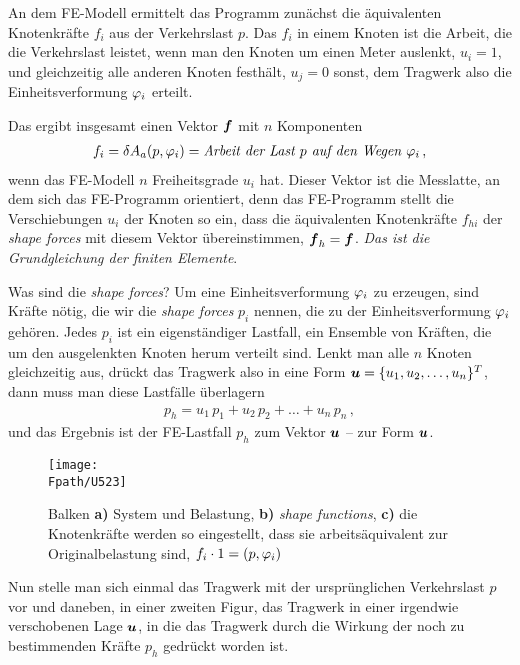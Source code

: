 An dem FE-Modell ermittelt das Programm zun\"{a}chst die \"{a}quivalenten Knotenkr\"{a}fte $f_i$ aus der Verkehrslast $p$. Das $f_i$ in einem Knoten ist die Arbeit, die die Verkehrslast leistet, wenn man den Knoten um einen Meter auslenkt, $u_i = 1$, und gleichzeitig alle anderen Knoten festh\"{a}lt, $u_j = 0$ sonst, dem Tragwerk also die Einheitsverformung $\varphi_i$ erteilt.

Das ergibt insgesamt einen Vektor $\mbox{\boldmath $f$} $ mit $n$ Komponenten
\begin{align}
f_i = \delta A_a(p,\varphi_i) = \text{{\em Arbeit der Last $p$ auf den Wegen $\varphi_i$\/}}\,,
\end{align}
wenn das FE-Modell $n$ Freiheitsgrade $u_i$ hat. Dieser Vektor ist die Messlatte, an dem sich das FE-Programm orientiert, denn das FE-Programm stellt die Verschiebungen $u_i$ der Knoten so ein, dass die \"{a}quivalenten Knotenkr\"{a}fte $f_{hi}$ der {\em shape forces\/} mit diesem Vektor \"{u}bereinstimmen, $\mbox{\boldmath $f$}_h = \mbox{\boldmath $f$}$. {\em Das ist die Grundgleichung der finiten Elemente\/}.

Was sind die {\em shape forces\/}? Um eine Einheitsverformung $\varphi_i$ zu erzeugen, sind Kr\"{a}fte n\"{o}tig, die wir die {\em shape forces\/} $p_i$ nennen, die zu der Einheitsverformung $\varphi_i$ geh\"{o}ren. Jedes $p_i$ ist ein eigenst\"{a}ndiger Lastfall, ein Ensemble von Kr\"{a}ften, die um den ausgelenkten Knoten herum verteilt sind. Lenkt man alle $n$ Knoten gleichzeitig aus, dr\"{u}ckt das Tragwerk also in eine Form $\mbox{\boldmath $u$} = \{u_1, u_2, \ldots, u_n\}^T$, dann muss man diese Lastf\"{a}lle \"{u}berlagern
\begin{align}
p_h = u_1\,p_1 + u_2\,p_2 + \ldots + u_n\,p_n\,,
\end{align}
und das Ergebnis ist der FE-Lastfall $p_h$ zum Vektor $\mbox{\boldmath $u$}$ -- zur Form $\mbox{\boldmath $u$}$.
\begin{figure}[tbp] \centering
\if {} \sidecaption \fi
\texttt{[image: \\Fpath/U523]}
\caption{Balken \textbf{ a)} System und Belastung, \textbf{ b)} {\em shape functions\/}, \textbf{ c)} die Knotenkr\"{a}fte wer\-den so eingestellt, dass sie arbeits\"{a}quivalent zur
Originalbelastung sind, $f_i \cdot 1 = (p,\varphi_i)$}
\label{U523}
\end{figure}%

Nun stelle man sich einmal das Tragwerk mit der urspr\"{u}nglichen Verkehrslast $p$ vor und daneben, in einer zweiten Figur, das Tragwerk in einer irgendwie verschobenen Lage $\mbox{\boldmath $u$} $, in die das Tragwerk durch die Wirkung der noch zu bestimmenden Kr\"{a}fte $p_h $ gedr\"{u}ckt worden ist.


